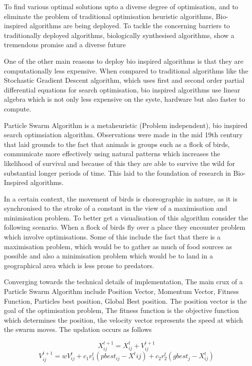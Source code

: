 \documentclass[12pt]{article}
\newcommand{\nd}{\noindent}
\begin{document}
\nd To find various optimal solutions upto a diverse degree of optimisation, and to eliminate the problem of traditional optimisation heuristic algorithms, Bio-inspired algorithms are being deployed. To tackle the concerning barriers to traditionally deployed algorithms, biologically synthesised algorithms, show a tremendous promise and a diverse future 

\nd  One of the other main reasons to deploy bio inspired algorithms is that they are computationally less expensive. When compared to traditional algorithms like the Stochastic Gradient Descent algorithm, which uses first and second order partial differential equations for search optimisation, bio inspired algorithms use linear algebra which is not only less expensive on the syste, hardware but also faster to compute. 

\nd Particle Swarm Algorithm is a metaheuristic (Problem independent), bio inspired search optimsiation algorithm. Observations were made in the mid 19th century that laid grounds to the fact that animals is groups such as a flock of birds, communicate more effectively using natural patterns which increases the likelihood of survival and because of this they are able to survive the wild for substantial longer periods of time. This laid to the foundation of research in Bio-Inspired algorithms. 

\nd In a certain context, the movement of birds is choreographic in nature, as it is synchronised to the stroke of a constant in the view of a maximisation and minimisation problem. 
\newpage
\nd To better get a visualisation of this algorithm consider the following scenario. When a flock of birds fly over a place they encounter problem which involve optimisations. Some of this include the fact that there is a maximisation problem, which would be to gather as much of food sources as possible and also a minimisation problem which would be to land in a geographical area which is less prone to predators. 

\nd Converging towards the technical details of implementation, The main crux of a Particle Swarm Algorithm include Position Vector, Momentum Vector, Fitness Function, Particles best position, Global Best position. The position vector is the goal of the optimisation problem, The fitness function is the objective function which determines the position, the velocity vector represents the speed at which the swarm moves. The updation occurs as follows 

\begin{equation}
X^{t+1}_{ij}= X^{t}_{ij}+ V^{t+1}_{ij} 
\end{equation} 
\begin{equation}
V^{t+1}_{ij}= wV^{t}_{ij}+c_1 r^{t}_{1} (pbest_{ij}-X^{t}{ij})+c_2 r^{t}_{2}(gbest_j - X^{t}_{ij})
\end{equation} 
\end{document}
